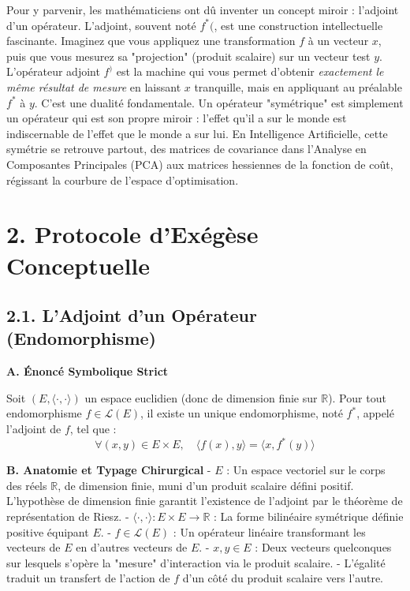 \documentclass[11pt,a4paper]{article}
\begin{document}
Pour y parvenir, les mathématiciens ont dû inventer un concept miroir : l'adjoint d'un opérateur. L'adjoint, souvent noté $f^*($, est une construction intellectuelle fascinante. Imaginez que vous appliquez une transformation $f$ à un vecteur $x$, puis que vous mesurez sa "projection" (produit scalaire) sur un vecteur test $y$. L'opérateur adjoint $f^)$ est la machine qui vous permet d'obtenir \textit{exactement le même résultat de mesure} en laissant $x$ tranquille, mais en appliquant au préalable $f^*$ à $y$. C'est une dualité fondamentale. Un opérateur "symétrique" est simplement un opérateur qui est son propre miroir : l'effet qu'il a sur le monde est indiscernable de l'effet que le monde a sur lui. En Intelligence Artificielle, cette symétrie se retrouve partout, des matrices de covariance dans l'Analyse en Composantes Principales (PCA) aux matrices hessiennes de la fonction de coût, régissant la courbure de l'espace d'optimisation.

\section{2. Protocole d'Exégèse Conceptuelle}

\subsection{2.1. L'Adjoint d'un Opérateur (Endomorphisme)}

\textbf{A. Énoncé Symbolique Strict}

Soit $(E, \langle \cdot, \cdot \rangle)$ un espace euclidien (donc de dimension finie sur $\mathbb{R}$).
Pour tout endomorphisme $f \in \mathcal{L}(E)$, il existe un unique endomorphisme, noté $f^*$, appelé l'adjoint de $f$, tel que :
$$ \forall (x,y) \in E \times E, \quad \langle f(x), y \rangle = \langle x, f^*(y) \rangle $$

\textbf{B. Anatomie et Typage Chirurgical}
- $E$ : Un espace vectoriel sur le corps des réels $\mathbb{R}$, de dimension finie, muni d'un produit scalaire défini positif. L'hypothèse de dimension finie garantit l'existence de l'adjoint par le théorème de représentation de Riesz.
- $\langle \cdot, \cdot \rangle : E \times E \to \mathbb{R}$ : La forme bilinéaire symétrique définie positive équipant $E$.
- $f \in \mathcal{L}(E)$ : Un opérateur linéaire transformant les vecteurs de $E$ en d'autres vecteurs de $E$.
- $x, y \in E$ : Deux vecteurs quelconques sur lesquels s'opère la "mesure" d'interaction via le produit scalaire.
- L'égalité traduit un transfert de l'action de $f$ d'un côté du produit scalaire vers l'autre.
\end{document}
